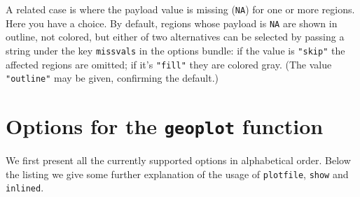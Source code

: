 \documentclass{article}
\begin{document}
A related case is where the payload value is missing (\texttt{NA}) for
one or more regions. Here you have a choice. By default, regions whose
payload is \texttt{NA} are shown in outline, not colored, but either
of two alternatives can be selected by passing a string under the key
\texttt{missvals} in the options bundle: if the value is \verb|"skip"|
the affected regions are omitted; if it's \verb|"fill"| they are
colored gray. (The value \verb|"outline"| may be given, confirming the
default.)

\section{Options for the \texttt{geoplot} function}
\label{sec:opts}

We first present all the currently supported options in alphabetical
order. Below the listing we give some further explanation of the usage
of \texttt{plotfile}, \texttt{show} and \texttt{inlined}.
\end{document}
